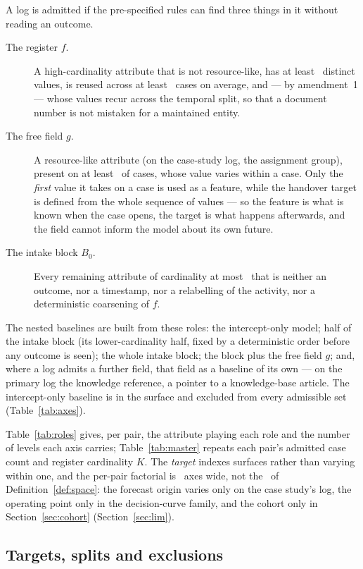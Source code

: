 \documentclass[11pt,3p,review,authoryear]{elsarticle}
\theoremstyle{definition}
\begin{document}
A log is admitted if the pre-specified rules can find three things in it
without reading an outcome.

\begin{description}
\item[The register $f$.] A high-cardinality attribute that is not
resource-like, has at least \minCardF\ distinct values, is reused across at
least \minReuseF\ cases on average, and --- by amendment~1 --- whose values
recur across the temporal split, so that a document number is not mistaken for
a maintained entity.
\item[The free field $g$.] A resource-like attribute (on the case-study log,
the assignment group), present on at least \minGPresent\ of cases, whose
value varies within a case. Only the \emph{first} value it takes on a case is
used as a feature, while the handover target is defined from the whole
sequence of values --- so the feature is what is known when the case opens,
the target is what happens afterwards, and the field cannot inform the model
about its own future.
\item[The intake block $B_0$.] Every remaining attribute of cardinality at
most \maxCardBZero\ that is neither an outcome, nor a timestamp, nor a
relabelling of the activity, nor a deterministic coarsening of $f$.
\end{description}

The nested baselines are built from these roles: the intercept-only model;
half of the intake block (its lower-cardinality half, fixed by a
deterministic order before any outcome is seen); the whole intake block; the
block plus the free field $g$; and, where a log admits a further field, that
field as a baseline of its own --- on the primary log the knowledge
reference, a pointer to a knowledge-base article. The intercept-only baseline
is in the surface and excluded from every admissible set
(Table~\ref{tab:axes}).

Table~\ref{tab:roles} gives, per pair, the attribute playing each role and the
number of levels each axis carries; Table~\ref{tab:master} repeats each
pair's admitted case count and register cardinality $K$. The \emph{target}
indexes surfaces rather than varying within one, and the per-pair factorial
is \nPerPairAxes\ axes wide, not the \nAxes\ of Definition~\ref{def:space}:
the forecast origin varies only on the case study's log, the operating point
only in the decision-curve family, and the cohort only in
Section~\ref{sec:cohort} (Section~\ref{sec:lim}).

\subsection{Targets, splits and exclusions}
\label{sec:targets}
\end{document}
